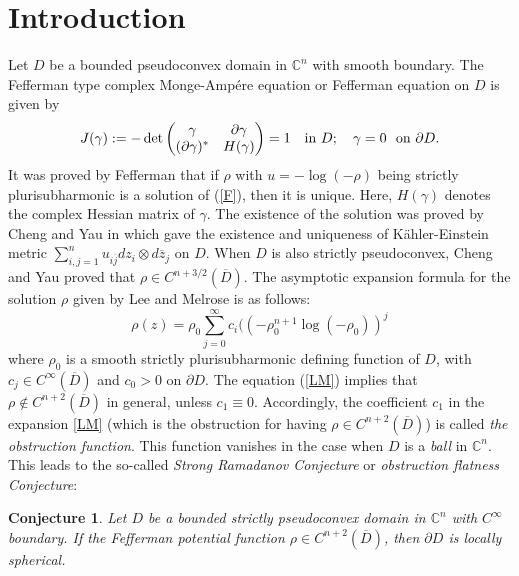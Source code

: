 \documentclass[12pt]{amsart}
\newtheorem{conjecture}{Conjecture}[section]
\def\d{\partial}
\def\CC{\mathbb{C}}
\def\jbar{\overline{j}}
\def\zbar{\overline{z}}
\def\d{\partial}
\begin{document}
\section{Introduction}
Let $D$ be a bounded pseudoconvex domain in $\CC^n$ with smooth boundary. 
 The Fefferman type complex Monge-Amp\'ere equation or Fefferman equation on $D$ is given by
 \begin{equation}\label{F}
 J(\gamma):= -\det
\begin{pmatrix}
\gamma & \partial \gamma \\
(\partial \gamma)^* & H(\gamma)
\end{pmatrix} = 1 \quad \hbox{in } D; \quad \gamma=0 \ \hbox{ on } \d D.
\end{equation}
It was  proved by Fefferman \cite{Fe76} that if $\rho$ with $u=-\log(-\rho)$ being strictly plurisubharmonic  is a solution of (\ref{F}), then it is unique. 
Here, $H(\gamma)$ denotes the complex Hessian matrix of $\gamma$. The existence of the solution was proved by Cheng and Yau
 in \cite{CY80} which gave the existence and uniqueness of K\"ahler-Einstein metric $\sum_{i,j=1}^n u_{i\jbar} dz_i \otimes d\zbar_j$ on $D$. When $D$ is also strictly 
 pseudoconvex, Cheng and Yau proved that $\rho\in C^{n+3/2} (\overline{D})$. The asymptotic expansion formula for the solution $\rho$ given by Lee and Melrose \cite{LM82} is as follows:
 \begin{equation}\label{LM}
 \rho(z)=\rho_0 \sum_{j=0}^\infty c_i ((-\rho_0^{n+1} \log(-\rho_0))^j
 \end{equation}
 where $\rho_0$ is a smooth strictly plurisubharmonic defining function of $D$, with $c_j\in C^\infty (\overline{D})$ and $c_0>0$ on $\d D$.  The equation (\ref{LM}) implies that
 $\rho\not\in C^{n+2}(\overline{D})$ in general, unless $c_1\equiv 0$. Accordingly, the coefficient $c_1$ in the expansion \eqref{LM} (which is the obstruction for having $\rho\in C^{n+2}(\overline{D})$)  is called {\em the obstruction function}. This function vanishes in the case when $D$ is a {\em ball} in $\mathbb C^n$.  This leads to the so-called {\em Strong Ramadanov Conjecture} or {\em obstruction flatness Conjecture}:
 \begin{conjecture} Let $D$ be a bounded strictly pseudoconvex domain in $\CC^n$ with $C^\infty$ boundary. If the Fefferman potential function $\rho \in C^{n+2} (\overline{D})$, then $\d D$ is locally spherical. 
 \end{conjecture} 
 
\end{document}
